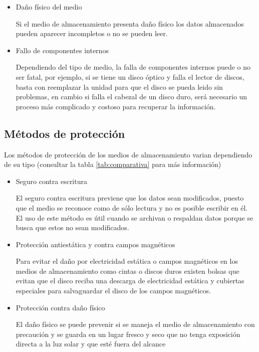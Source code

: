    \begin{itemize}

      \item Da\~{n}o f\'{i}sico del medio

Si el medio de almacenamiento presenta da\~{n}o f\'{i}sico los datos almacenados pueden aparecer incompletos o no se pueden leer.


      \item Fallo de componentes internos

Dependiendo del tipo de medio, la falla de componentes internos puede o no ser fatal, por ejemplo, si se tiene un disco \'{o}ptico y falla el lector de discos, basta con reemplazar la unidad para que el disco se pueda leido sin problemas, en cambio si falla el cabezal de un disco duro, ser\'{a} necesario un proceso m\'{a}s complicado y costoso para recuperar la informaci\'{o}n.


    \end{itemize}

  \subsection {M\'{e}todos de protecci\'{o}n}

Los m\'{e}todos de protecci\'{o}n de los medios de almacenamiento varian dependiendo de su tipo (consultar la tabla \ref{tab:comparativa} para m\'{a}s informaci\'{o}n)

    \begin{itemize}

      \item Seguro contra escritura
        
El seguro contra escritura previene que los datos sean modificados, puesto que el medio se reconoce como de s\'{o}lo lectura y no es posible escribir en \'{e}l. El uso de este m\'{e}todo es \'{u}til cuando se archivan o respaldan datos porque se busca que estos no sean modificados.

      \item Protecci\'{o}n antiest\'{a}tica y contra campos magn\'{e}ticos
        
Para evitar el da\~{n}o por electricidad est\'{a}tica o campos magn\'{e}ticos en los medios de almacenamiento como cintas o discos duros existen bolsas que evitan que el disco reciba una descarga de electricidad est\'{a}tica y cubiertas especiales para salvaguardar el disco de los campos magn\'{e}ticos.

      \item Protecci\'{o}n contra da\~{n}o f\'{i}sico
       
El da\~{n}o f\'{i}sico se puede prevenir si se maneja el medio de almacenamiento con precauci\'{o}n y se guarda en un lugar fresco y seco que no tenga exposici\'{o}n directa a la luz solar y que est\'{e} fuera del alcance 

    \end{itemize}

